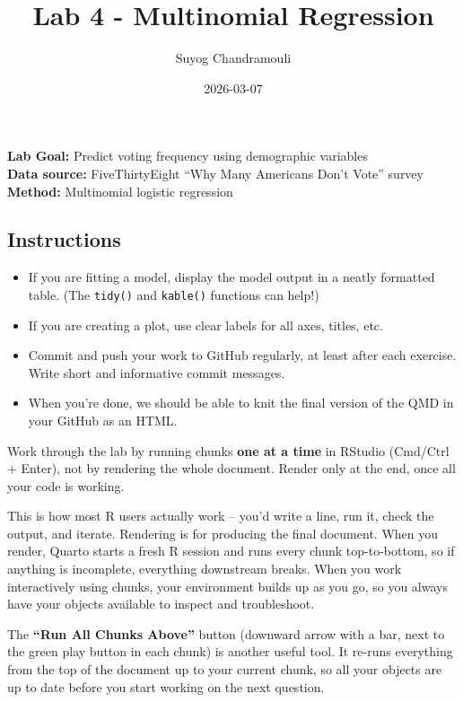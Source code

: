 \documentclass[
  letterpaper,
  DIV=11,
  numbers=noendperiod]{scrartcl}
\title{Lab 4 - Multinomial Regression}
\author{Suyog Chandramouli}
\date{2026-03-07}
\providecommand{\tightlist}{%
  \setlength{\itemsep}{0pt}\setlength{\parskip}{0pt}}
\begin{document}
\maketitle


\textbf{Lab Goal:} Predict voting frequency using demographic
variables\\
\textbf{Data source:} FiveThirtyEight ``Why Many Americans Don't Vote''
survey\\
\textbf{Method:} Multinomial logistic regression

\subsection{Instructions}\label{instructions}

\begin{itemize}
\tightlist
\item
  If you are fitting a model, display the model output in a neatly
  formatted table. (The \texttt{tidy()} and \texttt{kable()} functions
  can help!)
\item
  If you are creating a plot, use clear labels for all axes, titles,
  etc.
\item
  Commit and push your work to GitHub regularly, at least after each
  exercise. Write short and informative commit messages.
\item
  When you're done, we should be able to knit the final version of the
  QMD in your GitHub as an HTML.
\end{itemize}

\begin{tcolorbox}[enhanced jigsaw, toprule=.15mm, opacitybacktitle=0.6, coltitle=black, opacityback=0, bottomrule=.15mm, left=2mm, colframe=quarto-callout-tip-color-frame, leftrule=.75mm, toptitle=1mm, colbacktitle=quarto-callout-tip-color!10!white, rightrule=.15mm, colback=white, title=\textcolor{quarto-callout-tip-color}{\faLightbulb}\hspace{0.5em}{Workflow tip}, arc=.35mm, bottomtitle=1mm, titlerule=0mm, breakable]

Work through the lab by running chunks \textbf{one at a time} in RStudio
(Cmd/Ctrl + Enter), not by rendering the whole document. Render only at
the end, once all your code is working.

This is how most R users actually work -- you'd write a line, run it,
check the output, and iterate. Rendering is for producing the final
document. When you render, Quarto starts a fresh R session and runs
every chunk top-to-bottom, so if anything is incomplete, everything
downstream breaks. When you work interactively using chunks, your
environment builds up as you go, so you always have your objects
available to inspect and troubleshoot.

The \textbf{``Run All Chunks Above''} button (downward arrow with a bar,
next to the green play button in each chunk) is another useful tool. It
re-runs everything from the top of the document up to your current
chunk, so all your objects are up to date before you start working on
the next question.

\end{tcolorbox}
\end{document}
